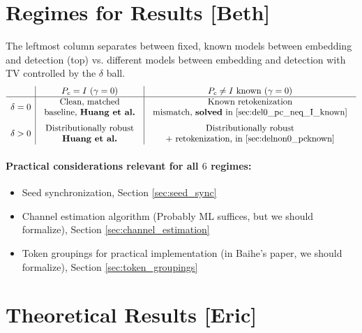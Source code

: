 \documentclass[12pt]{article}
\theoremstyle{plain}
\theoremstyle{definition}
\begin{document}
\section{Regimes for Results [Beth]}
The leftmost column separates between fixed, known models between embedding and detection (top) vs. different models between embedding and detection with TV controlled by the $\delta$ ball.
\[
\begin{array}{c|c|c}
& P_c = I~(\gamma=0)
& P_c \neq I\ \text{known}~(\gamma=0)
\\ \hline
\delta = 0
&
\begin{array}{c}
\text{Clean, matched}\\
\text{baseline, \textbf{Huang et al.}}
\end{array}
&
\begin{array}{c}
\text{Known retokenization}\\
\text{mismatch, \textbf{solved} in \ref{sec:del0_pc_neq_I_known}}
\end{array}
\\[12pt]
\delta > 0
&
\begin{array}{c}
\text{Distributionally robust}\\
\text{\textbf{Huang et al.}}
\end{array}
&
\begin{array}{c}
\text{Distributionally robust}\\
\text{+ retokenization, in \ref{sec:delnon0_pcknown}}
\end{array}
\end{array}
\]

\paragraph{Practical considerations relevant for all $6$ regimes:}
\begin{itemize}
    \item Seed synchronization, Section \ref{sec:seed_sync}
    \item Channel estimation algorithm (Probably ML suffices, but we should formalize), Section \ref{sec:channel_estimation}
    \item Token groupings for practical implementation (in Baihe's paper, we should formalize), Section \ref{sec:token_groupings}
\end{itemize}


\section{Theoretical Results [Eric]}
\label{sec:delnon0_pcknown}
\end{document}
